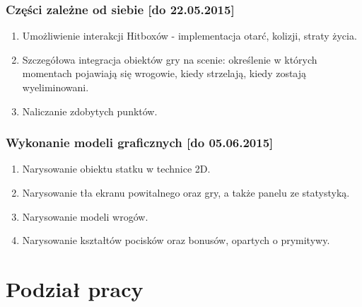\documentclass[a4paper,twoside]{article}
\begin{document}
	\section{Części zależne od siebie [do 22.05.2015]}
	\begin{enumerate}[label=\alph*.]
		\item Umożliwienie interakcji Hitboxów - implementacja otarć, kolizji, straty życia.
		\item Szczegółowa integracja obiektów gry na scenie: określenie w których momentach pojawiają się wrogowie, kiedy strzelają, kiedy zostają wyeliminowani.
		\item Naliczanie zdobytych punktów.
	\end{enumerate}
	\section{Wykonanie modeli graficznych [do 05.06.2015]}
	\begin{enumerate}[label=\alph*.]
		\item Narysowanie obiektu statku w technice 2D.
		\item Narysowanie tła ekranu powitalnego oraz gry, a także panelu ze statystyką.
		\item Narysowanie modeli wrogów.
		\item Narysowanie kształtów pocisków oraz bonusów, opartych o prymitywy.
	\end{enumerate}
	
	
	\newpage
	
	\part{Podział pracy}
	
\end{document}
